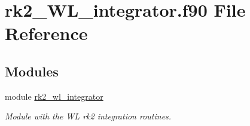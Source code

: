\hypertarget{rk2__WL__integrator_8f90}{}\section{rk2\+\_\+\+W\+L\+\_\+integrator.\+f90 File Reference}
\label{rk2__WL__integrator_8f90}
\subsection*{Modules}
\begin{DoxyCompactItemize}
\item 
module \hyperlink{namespacerk2__wl__integrator}{rk2\+\_\+wl\+\_\+integrator}
\begin{DoxyCompactList}\small\item\em Module with the WL rk2 integration routines. \end{DoxyCompactList}\end{DoxyCompactItemize}
